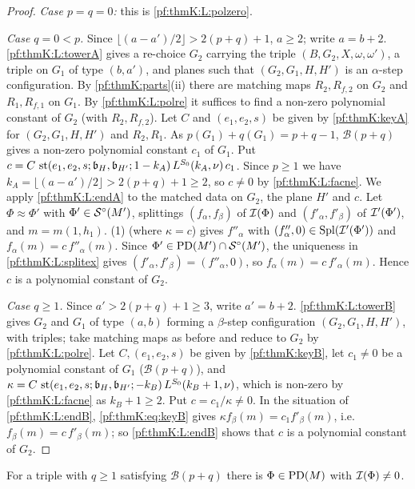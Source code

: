 \begin{proof}
\emph{Case $p=q=0$:} this is \ref{pf:thmK:L:polzero}.

\emph{Case $q=0<p$.} Since $\lfloor(a-a')/2\rfloor>2(p+q)+1$, $a\ge2$; write $a=b+2$. \ref{pf:thmK:L:towerA} gives a re-choice
$G_2$ carrying the triple $(B,G_2,X,\omega,\omega')$, a triple on $G_1$ of type $(b,a')$, and planes such that
$(G_2,G_1,H,H')$ is an $\alpha$-step configuration. By \cref{pf:thmK:parts}(ii) there are matching maps $R_2,R_{f,2}$ on
$G_2$ and $R_1,R_{f,1}$ on $G_1$. By \ref{pf:thmK:L:polre} it suffices to find a non-zero polynomial constant of $G_2$ (with
$R_2,R_{f,2}$). Let $C$ and $(e_1,e_2,s)$ be given by \cref{pf:thmK:keyA} for $(G_2,G_1,H,H')$ and $R_2,R_1$. As
$p(G_1)+q(G_1)=p+q-1$, $\mathcal B(p+q)$ gives a non-zero polynomial constant $c_1$ of $G_1$. Put
$c=C\,\operatorname{st}(e_1,e_2,s;\mathfrak b_H,\mathfrak b_{H'};1-k_A)\,L^{S_0}(k_A,\nu)\,c_1$. Since $p\ge1$ we have
$k_A=\lfloor(a-a')/2\rfloor>2(p+q)+1\ge2$, so $c\ne0$ by \ref{pf:thmK:L:facne}. We apply \ref{pf:thmK:L:endA} to the matched
data on $G_2$, the plane $H'$ and $c$. Let $\Phi\approx\Phi'$ with $\Phi'\in\mathcal{S}^{\circ}(M')$, splittings $(f_\alpha,f_\beta)$ of
$\mathcal{I}(\Phi)$ and $(f'_\alpha,f'_\beta)$ of $\mathcal{I}'(\Phi')$, and $m=m(1,h_1)$. (1) (where $\kappa=c$) gives
$f''_\alpha$ with $(f''_\alpha,0)\in\operatorname{Spl}(\mathcal{I}'(\Phi'))$ and $f_\alpha(m)=c\,f''_\alpha(m)$. Since $\Phi'\in\operatorname{PD}(M')
\cap\mathcal{S}^{\circ}(M')$, the uniqueness in \ref{pf:thmK:L:splitex} gives $(f'_\alpha,f'_\beta)=(f''_\alpha,0)$, so
$f_\alpha(m)=c\,f'_\alpha(m)$. Hence $c$ is a polynomial constant of $G_2$.

\emph{Case $q\ge1$.} Since $a'>2(p+q)+1\ge3$, write $a'=b+2$. \ref{pf:thmK:L:towerB} gives $G_2$ and $G_1$ of type $(a,b)$
forming a $\beta$-step configuration $(G_2,G_1,H,H')$, with triples; take matching maps as before and reduce to $G_2$ by
\ref{pf:thmK:L:polre}. Let $C,(e_1,e_2,s)$ be given by \cref{pf:thmK:keyB}, let $c_1\ne0$ be a polynomial constant of $G_1$
($\mathcal B(p+q)$), and $\kappa=C\,\operatorname{st}(e_1,e_2,s;\mathfrak b_H,\mathfrak b_{H'};-k_B)\,L^{S_0}(k_B+1,\nu)$, which is
non-zero by \ref{pf:thmK:L:facne} as $k_B+1\ge2$. Put $c=c_1/\kappa\ne0$. In the situation of \ref{pf:thmK:L:endB},
\eqref{pf:thmK:eq:keyB} gives $\kappa f_\beta(m)=c_1f'_\beta(m)$, i.e.\ $f_\beta(m)=c\,f'_\beta(m)$; so
\ref{pf:thmK:L:endB} shows that $c$ is a polynomial constant of $G_2$.
\end{proof}

\begin{lemma}\label{pf:thmK:nzV}
For a triple with $q\ge1$ satisfying $\mathcal B(p+q)$ there is $\Phi\in\operatorname{PD}(M)$ with $\mathcal{I}(\Phi)\ne0$.
\end{lemma}

